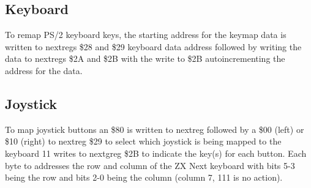 




\subsection{Keyboard}

To remap PS/2 keyboard keys, the starting address for the keymap data
is written to nextregs \$28 and \$29 keyboard data address followed by
writing the data to nextregs \$2A and \$2B with the write to \$2B
autoincrementing the address for the data.

\subsection{Joystick}

To map joystick buttons an \$80 is written to nextreg followed by a
\$00 (left) or \$10 (right) to nextreg \$29 to select which joystick
is being mapped to the keyboard 11 writes to nextgreg \$2B to indicate
the key(s) for each button. Each byte to addresses the row and column
of the ZX Next keyboard with bits 5-3 being the row and bits 2-0 being
the column (column 7, 111 is no action).
